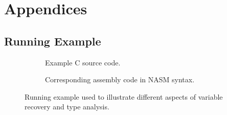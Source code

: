 
\onecolumn

\appendix
\setcounter{secnumdepth}{0}
\section{Appendices}
\setcounter{secnumdepth}{3}
\renewcommand{\thesubsection}{\Alph{subsection}}


\subsection{Running Example}
\label{app:running_example}

\begin{figure}[htbp]
	\centering
	\begin{subfigure}[ht]{0.3\textwidth}
		\centering
		
		\caption{Example C source code.}
		\label{fig:running_example_c}
	\end{subfigure}
	\qquad
	\begin{subfigure}[ht]{0.6\textwidth}
		\centering
		
		\caption{Corresponding assembly code in NASM syntax.}
		\label{fig:running_example_asm}
	\end{subfigure}
	\caption{Running example used to illustrate different aspects of variable recovery and type analysis.}
	\label{fig:running_example}
\end{figure}
